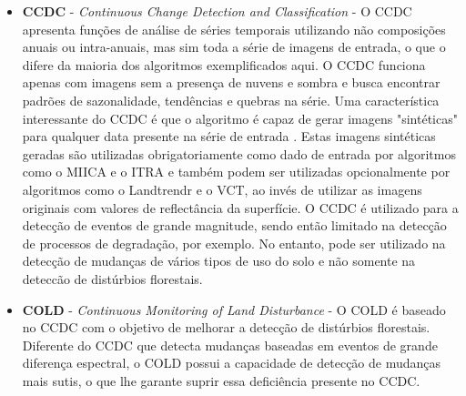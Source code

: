 \begin{itemize}
  \item \textbf{CCDC} - \textit{Continuous Change Detection and Classification} \citep{ZHU2014152} - O CCDC apresenta funções de análise de séries temporais utilizando não composições anuais ou intra-anuais, mas sim toda a série de imagens de entrada, o que o difere da maioria dos algoritmos exemplificados aqui. O CCDC funciona apenas com imagens sem a presença de nuvens e sombra e busca encontrar padrões de sazonalidade, tendências e quebras na série. Uma característica interessante do CCDC é que o algoritmo é capaz de gerar imagens "sintéticas" para qualquer data presente na série de entrada \citep{ZHU201567}. Estas imagens sintéticas geradas são utilizadas obrigatoriamente como dado de entrada por algoritmos como o MIICA e o ITRA e também podem ser utilizadas opcionalmente por algoritmos como o Landtrendr e o VCT, ao invés de utilizar as imagens originais com valores de reflectância da superfície. O CCDC é utilizado para a detecção de eventos de grande magnitude, sendo então limitado na detecção de processos de degradação, por exemplo. No entanto, pode ser utilizado na detecção de mudanças de vários tipos de uso do solo e não somente na deteccão de distúrbios florestais.
  
  \item \textbf{COLD} - \textit{Continuous Monitoring of Land Disturbance} \citep{Cohen2020} - O COLD é baseado no CCDC com o objetivo de melhorar a detecção de distúrbios florestais. Diferente do CCDC que detecta mudanças baseadas em eventos de grande diferença espectral, o COLD possui a capacidade de detecção de mudanças mais sutis, o que lhe garante suprir essa deficiência presente no CCDC.
  

\end{itemize}
